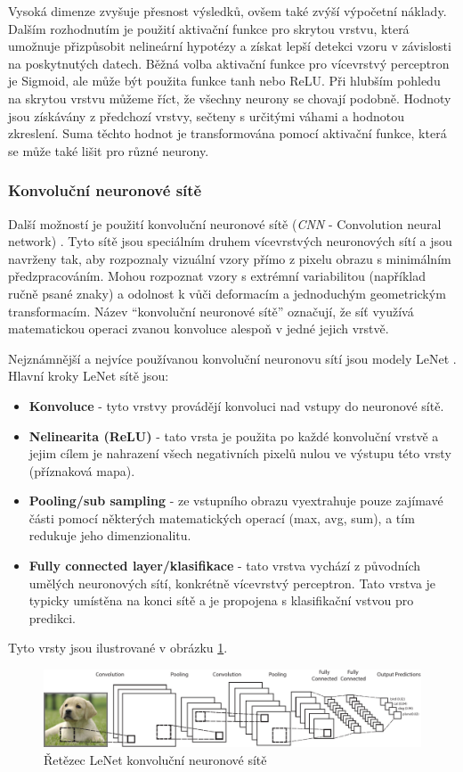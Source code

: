 Vysoká dimenze zvyšuje přesnost výsledků, ovšem také zvýší výpočetní náklady. Dalším rozhodnutím je použití aktivační funkce pro skrytou vrstvu, která umožnuje přizpůsobit nelineární hypotézy a získat lepší detekci vzoru v závislosti na poskytnutých datech. Běžná volba aktivační funkce pro vícevrstvý perceptron je Sigmoid, ale může být použita funkce tanh nebo ReLU. Při hlubším pohledu na skrytou vrstvu můžeme říct, že všechny neurony se chovají podobně. Hodnoty jsou získávány z předchozí vrstvy, sečteny s určitými váhami a hodnotou zkreslení.
Suma těchto hodnot je transformována pomocí aktivační funkce, která se může také lišit pro různé neurony.


\subsubsection*{Konvoluční neuronové sítě}
Další možností je použití konvoluční neuronové sítě (\textit{CNN} - Convolution neural network) \cite{lenet}. Tyto sítě jsou speciálním druhem vícevrstvých neuronových sítí a jsou navrženy tak, aby rozpoznaly vizuální vzory přímo z pixelu obrazu s minimálním předzpracováním. Mohou rozpoznat vzory s extrémní variabilitou (například ručně psané znaky) a odolnost k vůči deformacím a jednoduchým geometrickým transformacím. Název ``konvoluční neuronové sítě'' označují, že síť využívá matematickou operaci zvanou konvoluce alespoň v jedné jejich vrstvě.

Nejznámnější a nejvíce používanou konvoluční neuronovu sítí jsou modely LeNet \cite{lenet}.
Hlavní kroky LeNet sítě jsou:
\begin{itemize}
  \item{\textbf{Konvoluce} - tyto vrstvy provádějí konvoluci nad vstupy do neuronové sítě.}
  \item{\textbf{Nelinearita (ReLU)} - tato vrsta je použita po každé konvoluční vrstvě a jejim cílem je nahrazení všech negativních pixelů nulou ve výstupu této vrsty (příznaková mapa).}
  \item{\textbf{Pooling/sub sampling} - ze vstupního obrazu vyextrahuje pouze zajímavé části pomocí některých matematických operací (max, avg, sum), a tím redukuje jeho dimenzionalitu.}
  \item{\textbf{Fully connected layer/klasifikace} - tato vrstva vychází z původních umělých neuronových sítí, konkrétně vícevrstvý perceptron. Tato vrstva je typicky umístěna na konci sítě a je propojena s klasifikační vstvou pro predikci.}
\end{itemize}

Tyto vrsty jsou ilustrované v obrázku \ref{fig:cnn}.
\begin{figure}[H]
\centering
\includegraphics[width=1.\linewidth]{figures/cnn.pdf}
\caption{Řetězec LeNet konvoluční neuronové sítě \cite{lenet}}
\label{fig:cnn}
\end{figure}